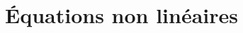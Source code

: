 \documentclass[resume]{subfiles}
\begin{document}
    \section{Équations non linéaires}


    
\end{document}
